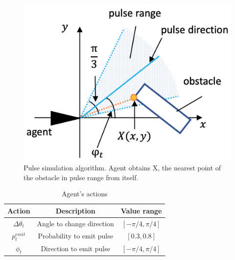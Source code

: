 \documentclass[../main]{subfiles}
\begin{document}
\newpage
{}
\begin{figure}[H]
  \centering
  \vfill
  \includegraphics[width=12cm]{figures/pulse_simulation.png}
  \caption{
    Pulse simulation algorithm. Agent obtains X,
    the nearest point of the obstacle in pulse range from itself.
  }\label{fig:pulse_simulation}
\end{figure}

\newpage
{}
\begin{table}[H]
  \caption{Agent's actions}\label{tab:agent actions}
  \centering
    \begin{tabular}{c|c|c}
      Action & Description & Value range \\ \hline
      $\Delta\theta_t$ & Angle to change direction & $[-\pi/4, \pi/4]$ \\
      $p^{emit}_t$ & Probability to emit pulse & $[0.3, 0.8]$ \\
      $\phi_t$ & Direction to emit pulse & $[-\pi/4, \pi/4]$ \\
    \end{tabular}
\end{table}
\end{document}
